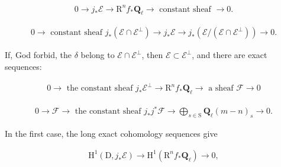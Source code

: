 \documentclass[10pt,leqno]{article}
\begin{document}
\begin{equation*}\begin{gathered}0 \longrightarrow  j_{*}\mathcal{E}  \longrightarrow  \mathrm{R}^{n} f_{*}\mathbf{Q}_{\ell } \longrightarrow \text{ constant sheaf }\longrightarrow  0.\end{gathered}\tag{7.1.2}\end{equation*}

\begin{equation*}\begin{gathered}0 \longrightarrow \text{ constant sheaf }j_{*}(\mathcal{E} \cap \mathcal{E} ^{\perp }) \longrightarrow  j_{*}\mathcal{E}  \longrightarrow  j_{*}(\mathcal{E} /(\mathcal{E} \cap \mathcal{E} ^{\perp })) \longrightarrow  0.\end{gathered}\tag{7.1.3}\end{equation*}

\noindent If, God forbid, the \(\delta \) belong to \(\mathcal{E} \cap \mathcal{E} ^{\perp }\), then \(\mathcal{E} \subset \mathcal{E} ^{\perp }\), and there are exact sequences:\par

\begin{equation*}\begin{gathered}0 \longrightarrow \text{ the constant sheaf }j_{*}\mathcal{E} ^{\perp } \longrightarrow  \mathrm{R}^{n} f_{*}\mathbf{Q}_{\ell } \longrightarrow \text{ a sheaf }\mathcal{F}  \longrightarrow  0\end{gathered}\tag{7.1.4}\end{equation*}

\begin{equation*}\begin{gathered}0 \longrightarrow  \mathcal{F}  \longrightarrow \text{ the constant sheaf }j_{*}j^{*}\mathcal{F}  \longrightarrow  \bigoplus\limits_{s\in \mathrm{S}}\mathbf{Q}_{\ell }(m- n)_{s} \longrightarrow  0.\end{gathered}\tag{7.1.5}\end{equation*}

\noindent In the first case, the long exact cohomology sequences give\par

\begin{equation*}\begin{gathered}\mathrm{H}^{1}(\mathrm{D},j_{*}\mathcal{E} ) \longrightarrow  \mathrm{H}^{1}(\mathrm{R}^{n} f_{*}\mathbf{Q}_{\ell }) \longrightarrow  0,\end{gathered}\tag{7.1.2′}\end{equation*}
\end{document}
